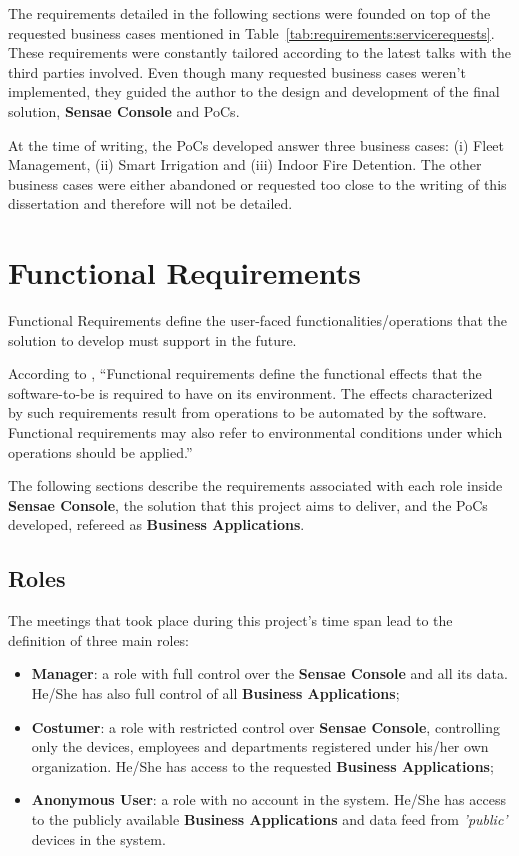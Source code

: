 The requirements detailed in the following sections were founded on top of the requested business cases mentioned in Table~\ref{tab:requirements:servicerequests}. These requirements were constantly tailored according to the latest talks with the third parties involved. Even though many requested business cases weren't implemented, they guided the author to the design and development of the final solution, \textbf{Sensae Console} and \gls{PoC}s.

At the time of writing, the \gls{PoC}s developed answer three business cases: (i) Fleet Management, (ii) Smart Irrigation and (iii) Indoor Fire Detention. The other business cases were either abandoned or requested too close to the writing of this dissertation and therefore will not be detailed.

\section{Functional Requirements}
\label{sec:requirements:functional}

Functional Requirements define the user-faced functionalities/operations that the solution to develop must support in the future.

According to \cite{van2009requirements}, ``Functional requirements define the functional effects that the software-to-be is required to have on its environment. The effects characterized by such requirements result from operations to be automated by the software. Functional requirements may also refer to environmental conditions under which operations should be applied.''

The following sections describe the requirements associated with each role inside \textbf{Sensae Console}, the solution that this project aims to deliver, and the \gls{PoC}s developed, refereed as \textbf{Business Applications}.

\subsection{Roles}
\label{subsec:requirements:functional:roles}

The meetings that took place during this project's time span lead to the definition of three main roles:

\begin{itemize}
    \item \textbf{Manager}: a role with full control over the \textbf{Sensae Console} and all its data. He/She has also full control of all \textbf{Business Applications};
    \item \textbf{Costumer}: a role with restricted control over \textbf{Sensae Console}, controlling only the devices, employees and departments registered under his/her own organization. He/She has access to the requested \textbf{Business Applications};
    \item \textbf{Anonymous User}: a role with no account in the system. He/She has access to the publicly available \textbf{Business Applications} and data feed from \textit{'public'} devices in the system.
\end{itemize}

